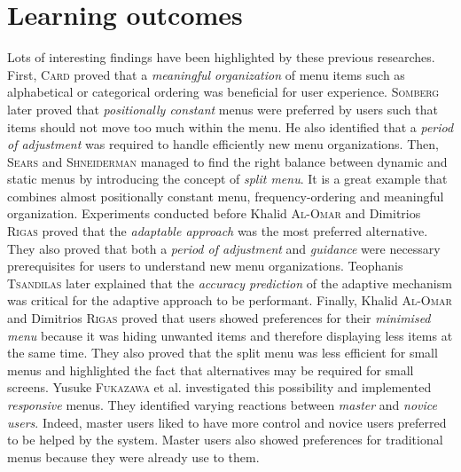 \section{Learning outcomes}
Lots of interesting findings have been highlighted by these previous 
researches. 
First, \textsc{Card} proved that a \textit{meaningful organization} of menu 
items such 
as alphabetical or categorical ordering was beneficial for user experience. 
\textsc{Somberg} later proved that \textit{positionally constant} menus were 
preferred 
by users such that items should not move too much within the menu. He also 
identified that a \textit{period of adjustment} was required to handle 
efficiently new menu organizations. Then, \textsc{Sears} and 
\textsc{Shneiderman} managed to find 
the right balance between dynamic and static menus by introducing the concept 
of 
\textit{split menu}. It is a great example that combines almost positionally 
constant menu, frequency-ordering and meaningful organization. Experiments 
conducted before Khalid \textsc{Al-Omar} and Dimitrios \textsc{Rigas} proved 
that the
\textit{adaptable approach} was the most preferred alternative. They also 
proved that both a \textit{period of adjustment} and \textit{guidance} were 
necessary prerequisites for users to understand new menu organizations. 
Teophanis \textsc{Tsandilas} later explained that the \textit{accuracy 
prediction} of 
the adaptive mechanism was critical for the adaptive approach to be performant. 
Finally, Khalid \textsc{Al-Omar} and Dimitrios \textsc{Rigas} proved that users 
showed preferences for their \textit{minimised menu} because it was hiding 
unwanted items and therefore displaying less items at the same time. They also 
proved that the split menu was less efficient for small menus and highlighted 
the fact that alternatives may be required for small screens. Yusuke 
\textsc{Fukazawa} et al. investigated this possibility and implemented 
\textit{responsive} menus. They identified varying reactions between 
\textit{master} and \textit{novice users}. 
Indeed, master users liked to have more control and novice users preferred to 
be 
helped by the system. Master users also showed preferences for traditional menus 
because they were already use to them.
